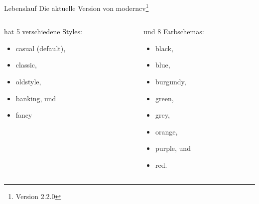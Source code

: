 \begin{frame}{Lebenslauf}
  \centering
Die aktuelle Version von moderncv\footnote{Version 2.2.0}
\vspace{0.5cm}
\begin{columns}[T]
    \begin{column}{0.5\textwidth}
      hat 5 verschiedene Styles:
      \begin{itemize}
        \item casual (default),
        \item classic,
        \item oldstyle,
        \item banking, und
        \item fancy
      \end{itemize}
    \end{column}

    \begin{column}{0.5\textwidth}
      und 8 Farbschemas:
      \begin{itemize}
        \item black,
        \item blue,
        \item burgundy,
        \item green,
        \item grey,
        \item orange,
        \item purple, und
        \item red.
      \end{itemize}
    \end{column}
  \end{columns}
\end{frame}
